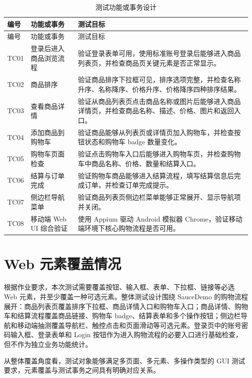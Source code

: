 \documentclass[UTF8,a4paper,12pt]{ctexart}
\begin{document}
\begin{longtable}{p{1.5cm}p{4.5cm}p{8cm}}
\caption{测试功能或事务设计}\\
\toprule
编号 & 功能或事务 & 测试目标 \\
\midrule
\endfirsthead
\toprule
编号 & 功能或事务 & 测试目标 \\
\midrule
\endhead
TC01 & 登录后进入商品浏览流程 & 验证登录表单可用，使用标准账号登录后能够进入商品列表页，并检查商品页关键元素是否正常显示。 \\
TC02 & 商品排序 & 验证商品排序下拉框可见，排序选项完整，并检查名称升序、名称降序、价格升序、价格降序四种排序结果。 \\
TC03 & 查看商品详情 & 验证从商品列表页点击商品名称或图片后能够进入商品详情页，并检查商品名称、描述、价格、图片和返回入口。 \\
TC04 & 添加商品到购物车 & 验证商品能够从列表页或详情页加入购物车，并检查按钮状态和购物车 badge 数量变化。 \\
TC05 & 购物车页面检查 & 验证点击购物车入口后能够进入购物车页，并检查购物车中商品名称、价格、数量和结算入口。 \\
TC06 & 结算与订单完成 & 验证购物车商品能够进入结算流程，填写结算信息后完成订单，并检查订单完成提示。 \\
TC07 & 侧边栏导航菜单 & 验证商品列表页侧边栏菜单能够正常展开、显示导航项并关闭。 \\
TC08 & 移动端 Web UI 综合验证 & 使用 Appium 驱动 Android 模拟器 Chrome，验证移动端环境下核心购物流程是否可用。 \\
\bottomrule
\end{longtable}

\section{Web 元素覆盖情况}

根据作业要求，本次测试需要覆盖按钮、输入框、表单、下拉框、链接等必选 Web 元素，并至少覆盖一种可选元素。整体测试设计围绕 SauceDemo 的购物流程展开：商品列表页覆盖排序下拉框、商品详情入口和购物车入口；商品详情、购物车和结算流程覆盖商品链接、购物车 badge、结算表单和多个操作按钮；侧边栏导航和移动端抽测覆盖导航栏、触控点击和页面滑动等可选元素。登录页中的账号密码输入框、登录表单和 Login 按钮作为进入购物流程的必要入口进行基础检查，但不作为独立业务功能统计。

从整体覆盖角度看，测试对象能够满足多页面、多元素、多操作类型的 GUI 测试要求，元素覆盖与测试事务之间具有明确对应关系。
\end{document}
